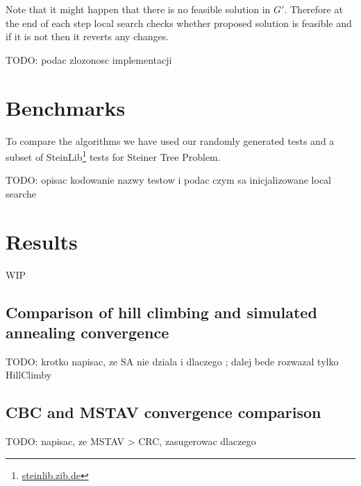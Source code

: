 Note that it might happen that there is no feasible solution in $G'$. Therefore at the end of each step local search checks whether proposed solution is feasible and if it is not then it reverts any changes.

TODO: podac zlozonosc implementacji

\section{Benchmarks}
To compare the algorithms we have used our randomly generated tests and a subset of SteinLib\footnote{\url{steinlib.zib.de}} tests for Steiner Tree Problem.

TODO: opisac kodowanie nazwy testow i podac czym sa inicjalizowane local searche

\section{Results}
WIP

\subsection{Comparison of hill climbing and simulated annealing convergence}
TODO: krotko napisac, ze SA nie dziala i dlaczego ; dalej bede rozwazal tylko HillClimby











\subsection{CBC and MSTAV convergence comparison}
TODO: napisac, ze MSTAV > CRC, zasugerowac dlaczego






